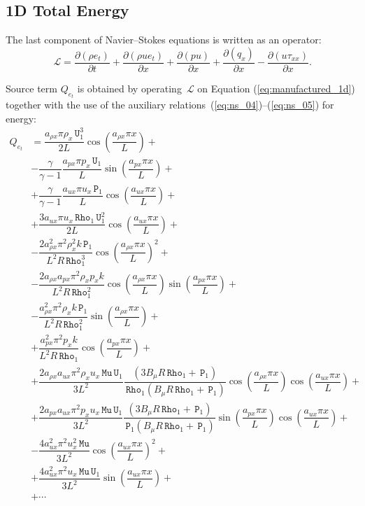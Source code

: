 \documentclass[10pt]{article}
\newcommand{\Diff}[2] {\dfrac{\partial( #1)}{\partial #2}}
\newcommand{\Rho}{\,\mathtt{Rho}}
\newcommand{\PP}{\,\mathtt{P}}
\newcommand{\U}{\,\mathtt{U}}
\newcommand{\Lo}{\,\mathcal{L}}
\newcommand{\MU}{\,\mathtt{Mu}}
\begin{document}
\subsection{1D Total Energy}


The last component of Navier--Stokes equations is written as an operator:
\begin{equation*}
 \Lo=\Diff{\rho e_t}{t} +\Diff{\rho ue_t}{x}+ \Diff{pu}{x}+ \Diff{q_x}{x}-\Diff{u\tau_{xx}}{x} .
\end{equation*}


Source term $Q_{e_t}$ is obtained by operating $\Lo$ on Equation  (\ref{eq:manufactured_1d}) together with the use of the  auxiliary relations~(\ref{eq:ns_04})--(\ref{eq:ns_05}) for energy:
  \begin{equation*}
 \begin{split}
Q_{e_t} &= \dfrac{a_{\rho x} \pi \rho_x \U_1^3 }{2L}\cos\left(\dfrac{a_{\rho x} \pi x}{L}\right)+\\
&- \dfrac{\gamma}{\gamma-1}\dfrac{a_{px} \pi p_x \U_1}{L}\sin\left(\dfrac{a_{px} \pi x}{L}\right) +\\
&+ \dfrac{\gamma}{\gamma-1}\dfrac{a_{ux} \pi u_x \PP_1}{L}\cos\left(\dfrac{a_{ux} \pi x}{L}\right)  +\\
&+ \dfrac{ 3 a_{ux} \pi u_x \Rho_1 \U_1^2 }{2L}\cos\left(\dfrac{a_{ux} \pi x}{L}\right)+\\
&-\dfrac{2 a_{\rho x}^2 \pi^2 \rho_x^2 k \PP_1}{L^2 R \Rho_1^3}\cos\left(\dfrac{a_{\rho x} \pi x}{L}\right)^2 +\\
&-\dfrac{2 a_{\rho x} a_{px} \pi^2 \rho_x p_x k }{L^2 R \Rho_1^2}\cos\left(\dfrac{a_{\rho x} \pi x}{L}\right) \sin\left(\dfrac{a_{px} \pi x}{L}\right) +\\
&-\dfrac{a_{\rho x}^2 \pi^2 \rho_x k \PP_1 }{L^2 R \Rho_1^2}\sin\left(\dfrac{a_{\rho x} \pi x}{L}\right) +\\
&+\dfrac{a_{px}^2 \pi^2 p_x k }{L^2 R \Rho_1}\cos\left(\dfrac{a_{px} \pi x}{L}\right) +\\
&+ \dfrac{2a_{\rho x} a_{ux} \pi^2 \rho_x u_x \MU \U_1 }{3L^2}\dfrac{(3 B_\mu R \Rho_1 +\PP_1) }{\Rho_1  (B_\mu R \Rho_1 +\PP_1)  }\cos\left(\dfrac{a_{\rho x} \pi x}{L}\right) \cos\left(\dfrac{a_{ux} \pi x}{L}\right)  +\\
&+ \dfrac{2a_{px} a_{ux} \pi^2 p_x u_x \MU \U_1 }{3L^2}\dfrac{(3 B_\mu R \Rho_1 +\PP_1) }{\PP_1 (B_\mu R \Rho_1 +\PP_1)  }\sin\left(\dfrac{a_{px} \pi x}{L}\right) \cos\left(\dfrac{a_{ux} \pi x}{L}\right)  +\\
&- \dfrac{4a_{ux}^2 \pi^2 u_x^2 \MU }{3L^2} \cos\left(\dfrac{a_{ux} \pi x}{L}\right)^2 +\\
&+ \dfrac{4a_{ux}^2 \pi^2 u_x \MU \U_1 }{3L^2}\sin\left(\dfrac{a_{ux} \pi x}{L}\right) +\\
&+\cdots \\
 \end{split}
\end{equation*}
\end{document}

